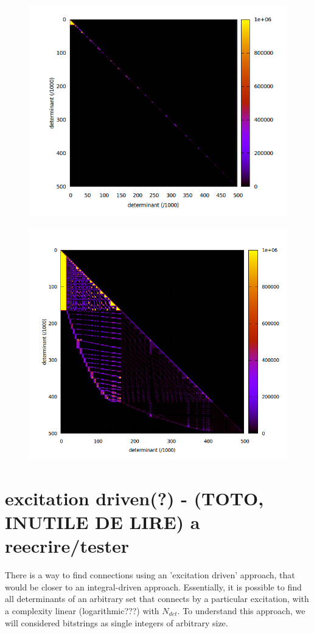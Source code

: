 \documentclass[./thesis.tex]{subfiles}
\begin{document}
    
    \begin{figure}[H]
	\begin{center}
		\includegraphics[width=0.6\columnwidth]{figures/davidson/aabb_subspace}
		\caption{{\label{fig:aabb_subspace}
		}}
	\end{center}
\end{figure}

\begin{figure}[H]
	\begin{center}
		\includegraphics[width=0.55\columnwidth]{figures/davidson/ab_subspace}
		\caption{{\label{fig:ab_subspace}
		}}
	\end{center}
\end{figure}

\section{excitation driven(?) - (TOTO, INUTILE DE LIRE) a reecrire/tester}

There is a way to find connections using an 'excitation driven' approach, that would be closer to an integral-driven approach. Essentially, it is possible to find all determinants of an arbitrary set that connects by a particular excitation, with a complexity linear (logarithmic???) with $N_{det}$.
To understand this approach, we will considered bitstrings as single integers of arbitrary size.
\end{document}
